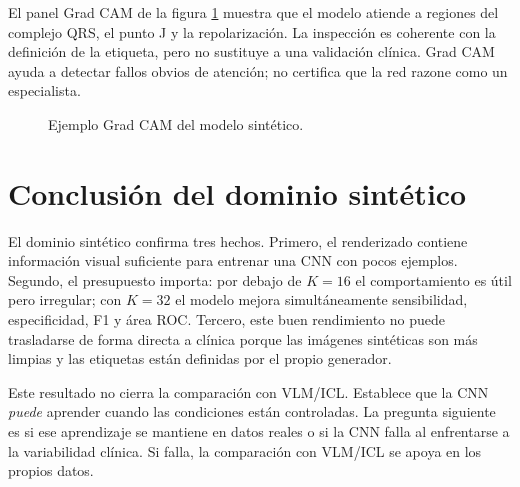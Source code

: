 El panel Grad CAM de la figura \ref{fig:cnn_simulator_gradcam_resultados} muestra que el modelo atiende a regiones del complejo QRS, el punto J y la repolarización. La inspección es coherente con la definición de la etiqueta, pero no sustituye a una validación clínica. Grad CAM ayuda a detectar fallos obvios de atención; no certifica que la red razone como un especialista.

\begin{figure}[H]
  \centering
  \caption{Ejemplo Grad CAM del modelo sintético.}
  \label{fig:cnn_simulator_gradcam_resultados}
\end{figure}

\section{Conclusión del dominio sintético}

El dominio sintético confirma tres hechos. Primero, el renderizado contiene información visual suficiente para entrenar una CNN con pocos ejemplos. Segundo, el presupuesto importa: por debajo de \(K=16\) el comportamiento es útil pero irregular; con \(K=32\) el modelo mejora simultáneamente sensibilidad, especificidad, F1 y área ROC. Tercero, este buen rendimiento no puede trasladarse de forma directa a clínica porque las imágenes sintéticas son más limpias y las etiquetas están definidas por el propio generador.

Este resultado no cierra la comparación con VLM/ICL. Establece que la CNN \emph{puede} aprender cuando las condiciones están controladas. La pregunta siguiente es si ese aprendizaje se mantiene en datos reales o si la CNN falla al enfrentarse a la variabilidad clínica. Si falla, la comparación con VLM/ICL se apoya en los propios datos.
